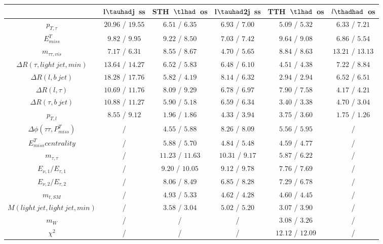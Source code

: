 \centering
\begin{tabular}{|c|c|c|c|c|c|} \hline
 & l$\tauhad$j~ss & STH~$\tlhad$~os & l$\tauhad$2j~ss & TTH~$\tlhad$~os & $l\thadhad$~os\\\hline
$p_{T,\tau }$ & $20.96$ / $19.55$ & $6.51$ / $6.35$ & $6.93$ / $7.00$ & $5.09$ / $5.32$ & $6.33$ / $7.21$\\\hline
$E^{T}_{miss}$ & $9.82$ / $9.95$ & $9.22$ / $8.50$ & $7.03$ / $7.42$ & $9.64$ / $9.08$ & $6.86$ / $5.54$\\\hline
$m_{\tau \tau ,vis}$ & $7.17$ / $6.31$ & $8.55$ / $8.67$ & $4.70$ / $5.65$ & $8.84$ / $8.63$ & $13.21$ / $13.13$\\\hline
$\Delta R(\tau ,light~jet,min)$ & $13.64$ / $14.27$ & $6.52$ / $5.83$ & $6.48$ / $6.10$ & $4.51$ / $4.38$ & $7.22$ / $8.84$\\\hline
$\Delta R(l,b~jet)$ & $18.28$ / $17.76$ & $5.82$ / $4.19$ & $8.14$ / $6.32$ & $2.94$ / $2.94$ & $6.52$ / $6.51$\\\hline
$\Delta R(l,\tau )$ & $10.69$ / $11.76$ & $8.09$ / $9.29$ & $6.78$ / $6.97$ & $7.90$ / $7.58$ & $4.17$ / $4.21$\\\hline
$\Delta R(\tau ,b~jet)$ & $10.88$ / $11.27$ & $5.90$ / $5.18$ & $6.59$ / $6.34$ & $3.40$ / $3.38$ & $4.70$ / $3.04$\\\hline
$p_{T,l}$ & $8.55$ / $9.12$ & $1.96$ / $1.86$ & $4.33$ / $3.94$ & $3.75$ / $3.60$ & $1.75$ / $1.26$\\\hline
$\Delta\phi(\tau \tau ,P^{T}_{miss})$ &  / & $4.55$ / $5.88$ & $8.26$ / $8.09$ & $5.56$ / $5.95$ &  /\\\hline
$E^{T}_{miss} centrality$ &  / & $5.88$ / $5.70$ & $4.84$ / $5.48$ & $4.59$ / $4.77$ &  /\\\hline
$m_{\tau ,\tau }$ &  / & $11.23$ / $11.63$ & $10.31$ / $9.17$ & $5.87$ / $6.22$ &  /\\\hline
$E_{\nu,1}/E_{\tau ,1}$ &  / & $9.20$ / $10.05$ & $9.12$ / $9.78$ & $7.76$ / $7.69$ &  /\\\hline
$E_{\nu,2}/E_{\tau ,2}$ &  / & $8.06$ / $8.49$ & $6.85$ / $8.28$ & $7.29$ / $6.78$ &  /\\\hline
$m_{t,SM}$ &  / & $4.93$ / $5.33$ & $4.62$ / $4.28$ & $4.60$ / $4.45$ &  /\\\hline
$M(light~jet,light~jet,min)$ &  / & $3.58$ / $3.04$ & $5.02$ / $5.20$ & $3.07$ / $3.90$ &  /\\\hline
$m_{W}$ &  / &  / &  / & $3.08$ / $3.26$ &  /\\\hline
$\chi^{2}$ &  / &  / &  / & $12.12$ / $12.09$ &  /\\\hline

\end{tabular}
